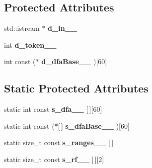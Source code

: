 \subsection*{Protected Attributes}
\begin{DoxyCompactItemize}
\item 
\hypertarget{classScannerBase_a642557896ede13c5abcf760451d8f4e4}{std\+::istream $\ast$ {\bfseries d\+\_\+in\+\_\+\+\_\+}}\label{classScannerBase_a642557896ede13c5abcf760451d8f4e4}

\item 
\hypertarget{classScannerBase_a72375048231dd617b0cf5bc9e6082eb2}{int {\bfseries d\+\_\+token\+\_\+\+\_\+}}\label{classScannerBase_a72375048231dd617b0cf5bc9e6082eb2}

\item 
\hypertarget{classScannerBase_aabb7825e2871ae7562dbe7e4af52b612}{int const ($\ast$ {\bfseries d\+\_\+dfa\+Base\+\_\+\+\_\+} )\mbox{[}60\mbox{]}}\label{classScannerBase_aabb7825e2871ae7562dbe7e4af52b612}

\end{DoxyCompactItemize}
\subsection*{Static Protected Attributes}
\begin{DoxyCompactItemize}
\item 
\hypertarget{classScannerBase_ab685af9cad317918294c24eb6dc8deb7}{static int const {\bfseries s\+\_\+dfa\+\_\+\+\_\+} \mbox{[}$\,$\mbox{]}\mbox{[}60\mbox{]}}\label{classScannerBase_ab685af9cad317918294c24eb6dc8deb7}

\item 
\hypertarget{classScannerBase_ac6b8b447499524147c97f3eccf9760fd}{static int const ($\ast$\mbox{[}$\,$\mbox{]} {\bfseries s\+\_\+dfa\+Base\+\_\+\+\_\+} )\mbox{[}60\mbox{]}}\label{classScannerBase_ac6b8b447499524147c97f3eccf9760fd}

\item 
static size\+\_\+t const {\bfseries s\+\_\+ranges\+\_\+\+\_\+} \mbox{[}$\,$\mbox{]}
\item 
\hypertarget{classScannerBase_a57a3ac6c72eff17211c2e58fc4eafb80}{static size\+\_\+t const {\bfseries s\+\_\+rf\+\_\+\+\_\+} \mbox{[}$\,$\mbox{]}\mbox{[}2\mbox{]}}\label{classScannerBase_a57a3ac6c72eff17211c2e58fc4eafb80}

\end{DoxyCompactItemize}


